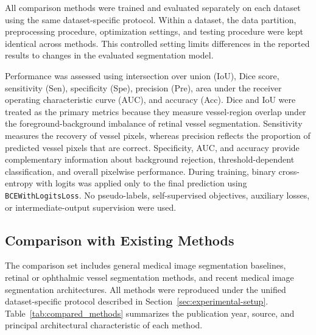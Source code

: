 \documentclass[a4paper,fleqn]{cas-sc}
\begin{document}
All comparison methods were trained and evaluated separately on each dataset using the same dataset-specific protocol. Within a dataset, the data partition, preprocessing procedure, optimization settings, and testing procedure were kept identical across methods. This controlled setting limits differences in the reported results to changes in the evaluated segmentation model.

Performance was assessed using intersection over union (IoU), Dice score, sensitivity (Sen), specificity (Spe), precision (Pre), area under the receiver operating characteristic curve (AUC), and accuracy (Acc). Dice and IoU were treated as the primary metrics because they measure vessel-region overlap under the foreground-background imbalance of retinal vessel segmentation. Sensitivity measures the recovery of vessel pixels, whereas precision reflects the proportion of predicted vessel pixels that are correct. Specificity, AUC, and accuracy provide complementary information about background rejection, threshold-dependent classification, and overall pixelwise performance. During training, binary cross-entropy with logits was applied only to the final prediction using \texttt{BCEWithLogitsLoss}. No pseudo-labels, self-supervised objectives, auxiliary losses, or intermediate-output supervision were used.

\subsection{Comparison with Existing Methods}

The comparison set includes general medical image segmentation baselines, retinal or ophthalmic vessel segmentation methods, and recent medical image segmentation architectures.
All methods were reproduced under the unified dataset-specific protocol described in Section~\ref{sec:experimental-setup}.
Table~\ref{tab:compared_methods} summarizes the publication year, source, and principal architectural characteristic of each method.
\end{document}
